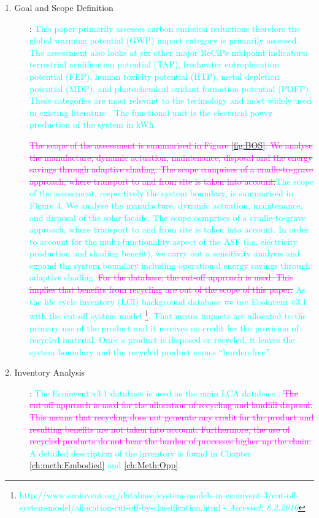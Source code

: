 \begin{description}

\item[1. Goal and Scope Definition]: \textcolor{cyan}{This paper primarily assesses carbon emission reductions therefore the global warming potential (GWP) impact category is primarily assessed. The assessment also looks at six other major ReCiPe midpoint indicators: terrestrial acidification potential (TAP), freshwater eutrophication potential (FEP), human toxicity potential (HTP), metal depletion potential (MDP), and photochemical oxidant formation potential (POFP). These categories are most relevant to the technology and most widely used in existing literature \cite{ortiz2009sustainability}. The functional unit is the electrical power production of the system in kWh.}

\textcolor{cyan}{\textcolor{magenta}{\sout{The scope of the assessment is summarised in Figure \ref{fig:BOS}. We analyse the  manufacture, dynamic actuation, maintenance, disposal and the energy savings through adaptive shading. The scope comprises of a cradle-to-grave approach, where transport to and from site is taken into account.}}The scope of the assessment, respectively the system boundary, is summarised in Figure 4. We analyse the manufacture, dynamic actuation, maintenance, and disposal of the solar facade. The scope comprises of a cradle-to-grave approach, where transport to and from site is taken into account. 
In order to account for the multi-functionality aspect of the ASF (i.e. electricity production and shading benefit), we carry out a sensitivity analysis and expand the system boundary including operational energy savings through adaptive shading. \textcolor{magenta}{\sout{ For the database, the cut-off approach is used. This implies that benefits from recycling are out of the scope of this paper.}} As the life cycle inventory (LCI) background database we use Ecoinvent v3.1 \cite{frischknecht2005ecoinvent} with the cut-off system model \footnote{\textcolor{cyan}{http://www.ecoinvent.org/database/system-models-in-ecoinvent-3/cut-off-system-model/allocation-cut-off-by-classification.html   -  \textit{Accessed: 8.2.2016}}}. That means impacts are allocated to the primary use of the product and it receives no credit for the provision of recycled material. Once a product is disposed or recycled, it leaves the system boundary and the recycled product comes “burden-free”.} 

\item[2. Inventory Analysis]: \textcolor{cyan}{The Ecoinvent v3.1 database is used as the main LCA database \cite{frischknecht2005ecoinvent}. \textcolor{magenta}{\sout{The cut-off approach is used for the allocation of recycling and  landfill disposal. This means that recycling does not generate any credit for the product and resulting benefits are not taken into account. Furthermore, the use of recycled products do not bear the burden of processes higher up the chain.}} A detailed description of the inventory is found in Chapter \ref{ch:meth:Embodied} and \ref{ch:Meth:Opp}.}


\end{description}
